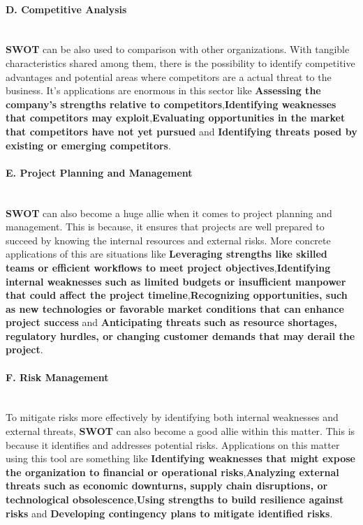 \paragraph{D. Competitive Analysis}\mbox{}\\
\textbf{SWOT} can be also used to comparison with other organizations. With tangible characteristics shared among them, there is the possibility to identify competitive advantages and potential areas where competitors are a actual threat to the business. It's applications are enormous in this sector like \textbf{Assessing the company's strengths relative to competitors},\textbf{Identifying weaknesses that competitors may exploit},\textbf{Evaluating opportunities in the market that competitors have not yet pursued} and \textbf{Identifying threats posed by existing or emerging competitors}.
\paragraph{E. Project Planning and Management}\mbox{}\\
\textbf{SWOT} can also become a huge allie when it comes to project planning and management. This is because, it ensures that projects are well prepared to succeed by knowing the internal resources and external risks. More concrete applications of this are situations like \textbf{Leveraging strengths like skilled teams or efficient workflows to meet project objectives},\textbf{Identifying internal weaknesses such as limited budgets or insufficient manpower that could affect the project timeline},\textbf{Recognizing opportunities, such as new technologies or favorable market conditions that can enhance project success} and \textbf{Anticipating threats such as resource shortages, regulatory hurdles, or changing customer demands that may derail the project}.
\paragraph{F. Risk Management}\mbox{}\\
To mitigate risks more effectively by identifying both internal weaknesses and external threats, \textbf{SWOT} can also become a good allie within this matter. This is because it identifies and addresses potential risks. 
Applications on this matter using this tool are something like \textbf{Identifying weaknesses that might expose the organization to financial or operational risks},\textbf{Analyzing external threats such as economic downturns, supply chain disruptions, or technological obsolescence},\textbf{Using strengths to build resilience against risks} and \textbf{Developing contingency plans to mitigate identified risks}.

